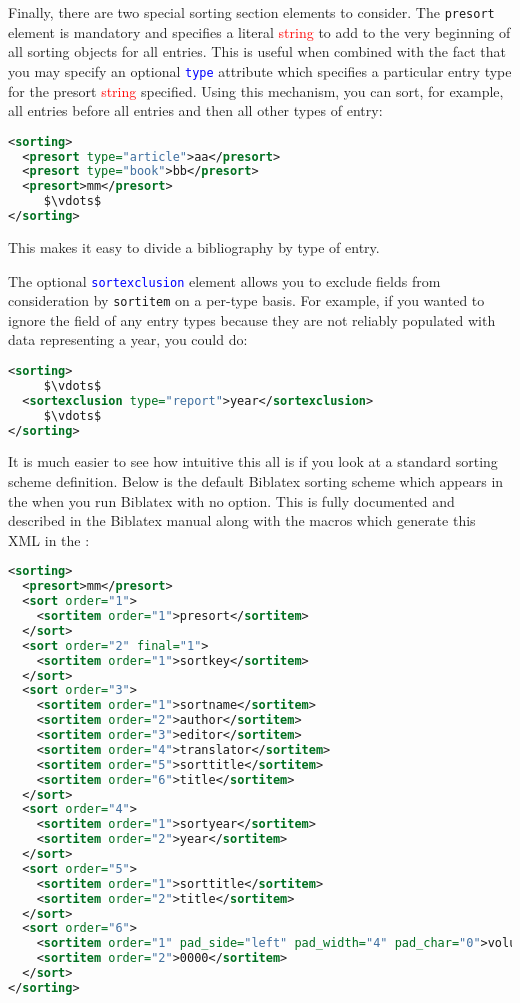 \documentclass{ltxdockit}
\newcommand*{\biblatex}{Biblatex\xspace}
\begin{document}
Finally, there are two special sorting section elements to consider. The
\texttt{presort} element is mandatory and specifies a literal \textcolor{red}{string} to add
to the very beginning of all sorting objects for all entries. This is useful
when combined with the fact that you may specify an optional
\textcolor{blue}{\texttt{type}} attribute which specifies a particular
entry type for the presort \textcolor{red}{string} specified. Using this
mechanism, you can sort, for example, all  entries before
all  entries and then all other types of entry:

\begin{lstlisting}[language=xml,escapechar=+,mathescape=true]
<sorting>
  <presort type="article">aa</presort>
  <presort type="book">bb</presort>
  <presort>mm</presort>
     $\vdots$
</sorting>
\end{lstlisting}
%
This makes it easy to divide a bibliography by type of entry.

The optional \textcolor{blue}{\texttt{sortexclusion}} element allows you to
exclude fields from consideration by \texttt{sortitem} on a per-type basis.
For example, if you wanted to ignore the  field of any
 entry types because they are not reliably populated with
data representing a year, you could do:

\begin{lstlisting}[language=xml,escapechar=+,mathescape=true]
<sorting>
     $\vdots$
  <sortexclusion type="report">year</sortexclusion>
     $\vdots$
</sorting>
\end{lstlisting}
%
It is much easier to see how intuitive this all is if you look at a
standard sorting scheme definition. Below is the default \biblatex sorting
scheme which appears in the  when you run \biblatex with no
 option. This is fully documented and described in the
\biblatex manual along with the \latex macros which generate this XML in
the :

\begin{lstlisting}[language=xml,escapechar=+,mathescape=true]
<sorting>
  <presort>mm</presort>
  <sort order="1">
    <sortitem order="1">presort</sortitem>
  </sort>
  <sort order="2" final="1">
    <sortitem order="1">sortkey</sortitem>
  </sort>
  <sort order="3">
    <sortitem order="1">sortname</sortitem>
    <sortitem order="2">author</sortitem>
    <sortitem order="3">editor</sortitem>
    <sortitem order="4">translator</sortitem>
    <sortitem order="5">sorttitle</sortitem>
    <sortitem order="6">title</sortitem>
  </sort>
  <sort order="4">
    <sortitem order="1">sortyear</sortitem>
    <sortitem order="2">year</sortitem>
  </sort>
  <sort order="5">
    <sortitem order="1">sorttitle</sortitem>
    <sortitem order="2">title</sortitem>
  </sort>
  <sort order="6">
    <sortitem order="1" pad_side="left" pad_width="4" pad_char="0">volume</sortitem>
    <sortitem order="2">0000</sortitem>
  </sort>
</sorting>
\end{lstlisting}
\bigskip
\end{document}
